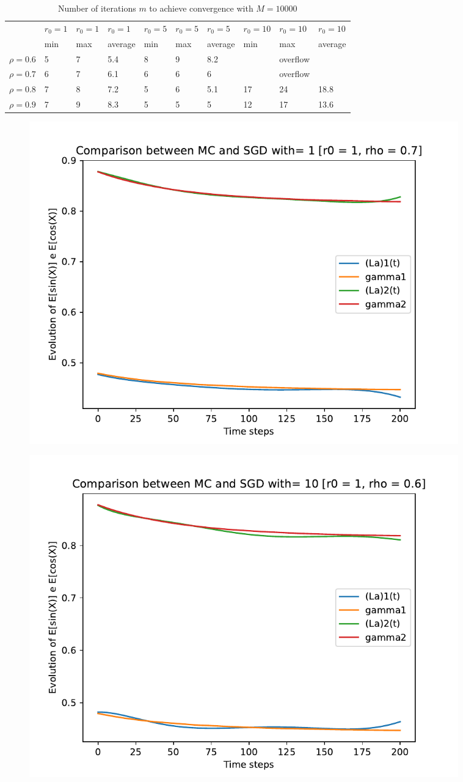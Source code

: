\documentclass[a4paper,11pt,openright]{report}
\begin{document}
\begin{table}[H]
\centering
\addtolength{\leftskip}{-1.5cm}
\addtolength{\rightskip}{-1.5cm}
\begin{tabular}{|c|lllllllll|}
\hline
$ $ & $r_0 = 1$ & $r_0 = 1$ & $r_0 = 1$ & $r_0 = 5$ & $r_0 = 5$ & $r_0 = 5$ & $r_0 = 10$ & $r_0 = 10$ & $r_0 = 10$  \\
$ $ & min & max & average & min & max & average & min & max & average \\ 
\hline
$\rho = 0.6$ & 5 & 7 & 5.4 & 8 & 9 & 8.2 &  & overflow &  \\

$\rho = 0.7$ & 6 & 7 & 6.1 & 6 & 6 & 6 &  & overflow &  \\

$\rho = 0.8$ & 7 & 8 & 7.2 & 5 & 6 & 5.1 & 17 & 24 & 18.8 \\

$\rho = 0.9$ & 7 & 9 & 8.3 & 5 & 5 & 5 & 12 & 17 & 13.6\\
\hline
\end{tabular}
\caption{Number of iterations $m$ to achieve convergence with $M = 10000$}
\end{table}
\begin{figure}[H]
\centering
\includegraphics[width=0.9\textwidth]{images/graphs T = 2/n = 6, M = 1 sine and cosine.pdf}
\end{figure}
\begin{figure}[H]
\centering
\includegraphics[width=0.9\textwidth]{images/graphs T = 2/n = 6, M = 10 sine and cosine.pdf}
\end{figure}
\end{document}
